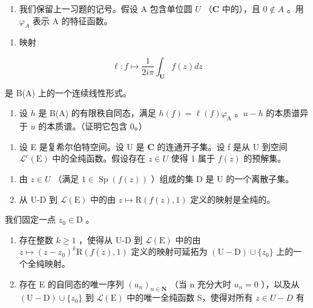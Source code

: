 \begin{enumerate}
\def\labelenumi{\arabic{enumi})}
\setcounter{enumi}{1}
\tightlist
\item
  我们保留上一习题的记号。假设 A 包含单位圆 \(U\) （\(\mathbf{C}\) 中的），且 \(0 \notin A\) 。用 \(\varphi_{A}\) 表示 A 的特征函数。
\end{enumerate}

\begin{enumerate}
\def\labelenumi{\alph{enumi})}
\tightlist
\item
  映射
\end{enumerate}

\[
\ell \colon f \mapsto \frac {1}{2 i \pi} \int_ {\mathbf {U}} f (z) d z
\]

是 B(A) 上的一个连续线性形式。

\begin{enumerate}
\def\labelenumi{\alph{enumi})}
\setcounter{enumi}{1}
\tightlist
\item
  设 \(h\) 是 B(A) 的有限秩自同态，满足 \(h(f) = \ell(f)\varphi_{\mathrm{A}}\) 。\(u - h\) 的本质谱异于 \(u\) 的本质谱。（证明它包含 0。）
\end{enumerate}

\begin{enumerate}
\def\labelenumi{\arabic{enumi})}
\setcounter{enumi}{2}
\tightlist
\item
  设 E 是复希尔伯特空间。设 U 是 \(\mathbf{C}\) 的连通开子集。设 f 是从 U 到空间 \(\mathcal{L}^{c}(\mathrm{E})\) 中的全纯函数。假设存在 \(z \in U\) 使得 1 属于 \(f(z)\) 的预解集。
\end{enumerate}

\begin{enumerate}
\def\labelenumi{\alph{enumi})}
\item
  由 \(z \in U\) （满足 \(1 \in \operatorname{Sp}(f(z))\) ）组成的集 D 是 U 的一个离散子集。
\item
  从 U-D 到 \(\mathcal{L}(\mathrm{E})\) 中的由 \(z\mapsto \mathrm{R}(f(z),1)\) 定义的映射是全纯的。
\end{enumerate}

我们固定一点 \(z_0 \in \mathrm{D}\) 。

\begin{enumerate}
\def\labelenumi{\alph{enumi})}
\setcounter{enumi}{2}
\item
  存在整数 \(k \geqslant 1\) ，使得从 U-D 到 \(\mathcal{L}(\mathrm{E})\) 中的由 \(z \mapsto (z - z_{0})^{k}\mathrm{R}(f(z), 1)\) 定义的映射可延拓为 \((\mathrm{U}-\mathrm{D}) \cup \{z_{0}\}\) 上的一个全纯映射。
\item
  存在 E 的自同态的唯一序列 \((u_{n})_{n\in\mathbf{N}}\) （当 n 充分大时 \(u_{n}=0\) ），以及从 \((\mathrm{U}-\mathrm{D})\cup\{z_{0}\}\) 到 \(\mathcal{L}(\mathrm{E})\) 中的唯一全纯函数 S，使得对所有 \(z\in U-D\) 有
\end{enumerate}

